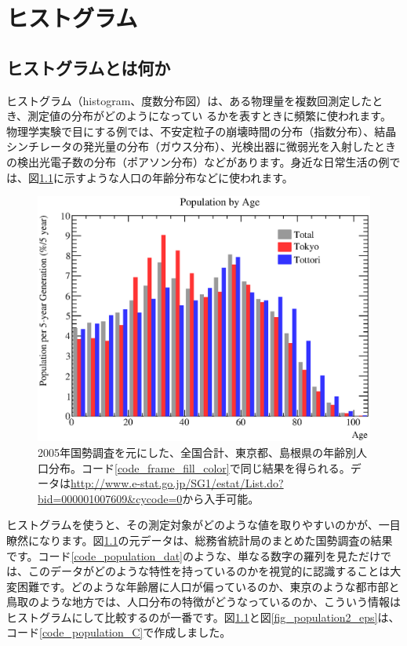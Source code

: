 \chapter{ヒストグラム}
\label{chap_Histogram}

\section{ヒストグラムとは何か}

ヒストグラム（histogram、度数分布図）は、ある物理量を複数回測定したとき、測定値の分布がどのようになってい るかを表すときに頻繁に使われます。物理学実験で目にする例では、不安定粒子の崩壊時間の分布（指数分布）、結晶シンチレータの発光量の分布（ガウス分布）、光検出器に微弱光を入射したときの検出光電子数の分布（ポアソン分布）などがあります。身近な日常生活の例では、図\ref{fig_population_eps}に示すような人口の年齢分布などに使われます。

\begin{figure}
  \centering
  \includegraphics[width=12cm,clip]{fig/population.eps}
  \caption{2005年国勢調査を元にした、全国合計、東京都、島根県の年齢別人口分布。コード\ref{code_frame_fill_color}で同じ結果を得られる。データは\url{http://www.e-stat.go.jp/SG1/estat/List.do?bid=000001007609&cycode=0}から入手可能。}
  \label{fig_population_eps}
\end{figure}

ヒストグラムを使うと、その測定対象がどのような値を取りやすいのかが、一目瞭然になります。図\ref{fig_population_eps}の元データは、総務省統計局のまとめた国勢調査の結果です。コード\ref{code_population_dat}のような、単なる数字の羅列を見ただけでは、このデータがどのような特性を持っているのかを視覚的に認識することは大変困難です。どのような年齢層に人口が偏っているのか、東京のような都市部と鳥取のような地方では、人口分布の特徴がどうなっているのか、こういう情報はヒストグラムにして比較するのが一番です。図\ref{fig_population_eps}と図\ref{fig_population2_eps}は、コード\ref{code_population_C}で作成しました。

